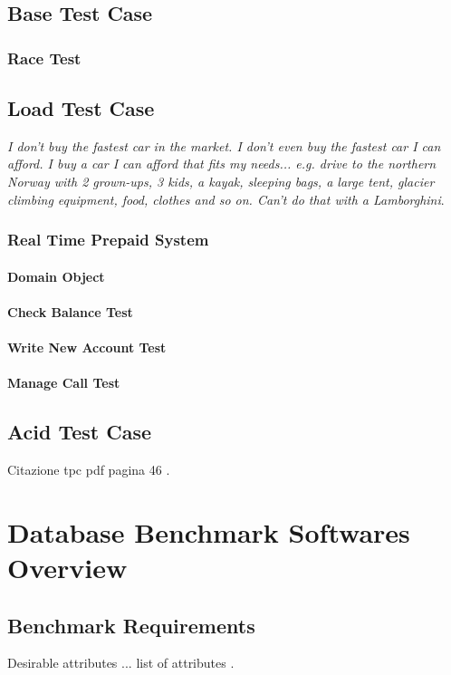 	\section{Base Test Case}
		\subsection{Race Test}
	\section{Load Test Case}
\emph{I don't buy the fastest car in the market. I don't even buy the fastest car I can afford. I buy a car I can afford that fits my needs... e.g. drive to the northern Norway with 2 grown-ups, 3 kids, a kayak, sleeping bags, a large tent, glacier climbing equipment, food, clothes and so on. Can't do that with a Lamborghini}\cite{Bernt}.

		\subsection{Real Time Prepaid System}
			\subsubsection{Domain Object}
			\subsubsection{Check Balance Test}
			\subsubsection{Write New Account Test}
			\subsubsection{Manage Call Test}
	\section{Acid Test Case}
Citazione tpc pdf pagina 46 \cite{TPC-C}.

\chapter{Database Benchmark Softwares Overview}
	\section{Benchmark Requirements}
Desirable attributes ... list of attributes \cite{tpc/sigmoid}.
	
